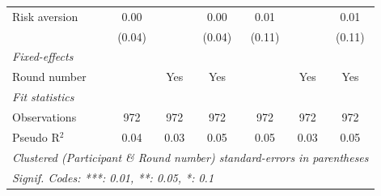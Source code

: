 \begin{tabular}{lcccccc}
   Risk aversion      & 0.00         &             & 0.00        & 0.01        &             & 0.01\\   
                      & (0.04)       &             & (0.04)      & (0.11)      &             & (0.11)\\   
   \midrule
   \emph{Fixed-effects}\\
   Round number       &              & Yes         & Yes         &             & Yes         & Yes\\  
   \midrule
   \emph{Fit statistics}\\
   Observations       & 972          & 972         & 972         & 972         & 972         & 972\\  
   Pseudo R$^2$       & 0.04         & 0.03        & 0.05        & 0.05        & 0.03        & 0.05\\  
   \midrule \midrule
   \multicolumn{7}{l}{\emph{Clustered (Participant \& Round number) standard-errors in parentheses}}\\
   \multicolumn{7}{l}{\emph{Signif. Codes: ***: 0.01, **: 0.05, *: 0.1}}\\
\end{tabular}
\par\endgroup
